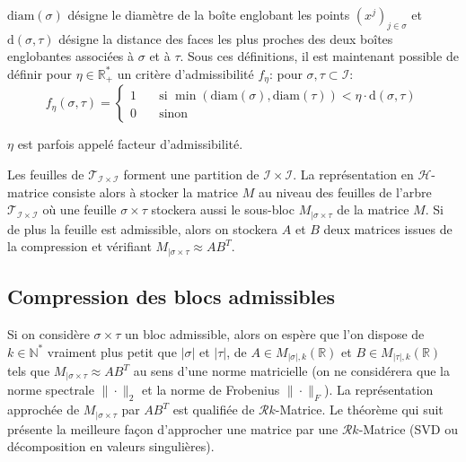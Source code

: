 \noindent $\mathrm{diam}(\sigma)$ désigne le diamètre de la boîte englobant les points $(x^j)_{j \in \sigma}$ et $\mathrm{d}(\sigma,\tau)$ désigne la
distance des faces les plus proches des deux boîtes englobantes associées à $\sigma$ et à $\tau$. Sous ces définitions,
il est maintenant possible de définir pour $\eta \in \mathbb{R}^{*}_{+}$ un critère d'admissibilité $f_{\eta}$: pour
$\sigma, \tau \subset \mathcal{I}$:
\begin{equation}
  \label{critAdmi}
  f_{\eta}(\sigma,\tau) =
  \begin{cases}
    1 & \quad \text{si } \min(\mathrm{diam}(\sigma),\mathrm{diam}(\tau)) < \eta \cdot \mathrm{d}(\sigma,\tau)\\
    0 & \quad \text{sinon}  \end{cases}
\end{equation}

\noindent $\eta$ est parfois appelé facteur d'admissibilité.\\


\begin{remark}
  Les feuilles de $\mathcal{T}_{\mathcal{I} \times \mathcal{I}}$ forment une partition de  $\mathcal{I} \times \mathcal{I}$. La représentation
  en $\mathcal{H}$-matrice consiste alors à stocker la matrice $M$ au niveau des feuilles de l'arbre $\mathcal{T}_{\mathcal{I} \times \mathcal{I}}$ où
  une feuille $\sigma \times \tau$ stockera aussi le sous-bloc $M_{|\sigma \times \tau}$ de la matrice $M$. Si de plus la feuille est admissible,
  alors on stockera $A$ et $B$ deux matrices issues de la compression et vérifiant $M_{|\sigma \times \tau} \approx AB^{T}$.
\end{remark}


\subsection{Compression des blocs admissibles}
\label{compBlocAdmi}
Si on considère $\sigma \times \tau$ un bloc admissible, alors on
espère que l'on dispose de $k \in \mathbb{N}^{*}$ vraiment plus petit que
$|\sigma|$ et $|\tau|$, de $A \in M_{|\sigma|,k}(\mathbb{R})$ et $B \in M_{|\tau|,k}(\mathbb{R})$ tels que $M_{|\sigma \times \tau} \approx AB^{T}$ au sens d'une norme
matricielle (on ne considérera que la norme spectrale $\|\cdot\|_2$ et la
norme de Frobenius $\|\cdot\|_F$). La représentation approchée de $M_{|\sigma \times \tau}$ par $AB^{T}$ est qualifiée de $\mathcal{R}k$-Matrice. Le théorème qui
suit présente la meilleure façon d'approcher une matrice par une
$\mathcal{R}k$-Matrice (SVD ou décomposition en valeurs singulières).

